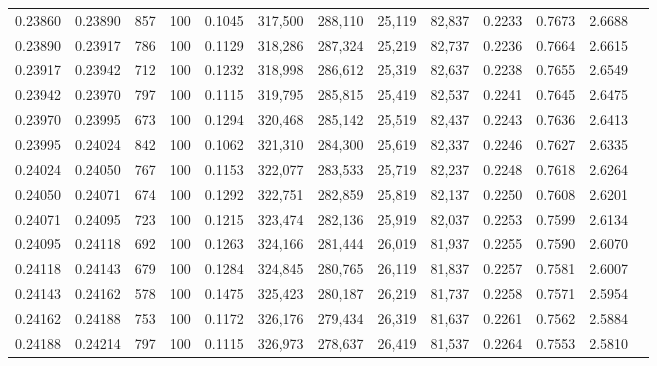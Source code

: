 \begin{tabular}{rrrrrrrrrrrrr}
0.23860 & 0.23890 &   857 & 100 &                                     0.1045 & 317,500 & 288,110 &  25,119 &  82,837 & 0.2233 & 0.7673 & 2.6688 \\
0.23890 & 0.23917 &   786 & 100 &                                     0.1129 & 318,286 & 287,324 &  25,219 &  82,737 & 0.2236 & 0.7664 & 2.6615 \\
0.23917 & 0.23942 &   712 & 100 &                                     0.1232 & 318,998 & 286,612 &  25,319 &  82,637 & 0.2238 & 0.7655 & 2.6549 \\
0.23942 & 0.23970 &   797 & 100 &                                     0.1115 & 319,795 & 285,815 &  25,419 &  82,537 & 0.2241 & 0.7645 & 2.6475 \\
0.23970 & 0.23995 &   673 & 100 &                                     0.1294 & 320,468 & 285,142 &  25,519 &  82,437 & 0.2243 & 0.7636 & 2.6413 \\
0.23995 & 0.24024 &   842 & 100 &                                     0.1062 & 321,310 & 284,300 &  25,619 &  82,337 & 0.2246 & 0.7627 & 2.6335 \\
0.24024 & 0.24050 &   767 & 100 &                                     0.1153 & 322,077 & 283,533 &  25,719 &  82,237 & 0.2248 & 0.7618 & 2.6264 \\
0.24050 & 0.24071 &   674 & 100 &                                     0.1292 & 322,751 & 282,859 &  25,819 &  82,137 & 0.2250 & 0.7608 & 2.6201 \\
0.24071 & 0.24095 &   723 & 100 &                                     0.1215 & 323,474 & 282,136 &  25,919 &  82,037 & 0.2253 & 0.7599 & 2.6134 \\
0.24095 & 0.24118 &   692 & 100 &                                     0.1263 & 324,166 & 281,444 &  26,019 &  81,937 & 0.2255 & 0.7590 & 2.6070 \\
0.24118 & 0.24143 &   679 & 100 &                                     0.1284 & 324,845 & 280,765 &  26,119 &  81,837 & 0.2257 & 0.7581 & 2.6007 \\
0.24143 & 0.24162 &   578 & 100 &                                     0.1475 & 325,423 & 280,187 &  26,219 &  81,737 & 0.2258 & 0.7571 & 2.5954 \\
0.24162 & 0.24188 &   753 & 100 &                                     0.1172 & 326,176 & 279,434 &  26,319 &  81,637 & 0.2261 & 0.7562 & 2.5884 \\
0.24188 & 0.24214 &   797 & 100 &                                     0.1115 & 326,973 & 278,637 &  26,419 &  81,537 & 0.2264 & 0.7553 & 2.5810 \\

\end{tabular}
